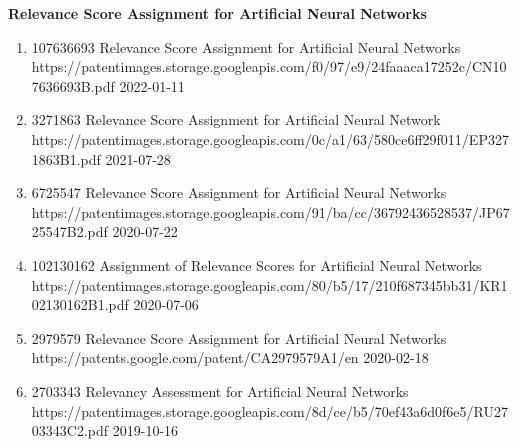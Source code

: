 \documentclass[10pt,a4paper]{article} %
\begin{document}
\headedsection %
{\bf Relevance Score Assignment for Artificial Neural Networks}
{
    \begin{enumerate}
        \item[] 
                          {107636693}
                          {Relevance Score Assignment for Artificial Neural Networks}
                          {https://patentimages.storage.googleapis.com/f0/97/e9/24faaaca17252c/CN107636693B.pdf}
                          {2022-01-11}

        \item [] 
                           {3271863}
                           {Relevance Score Assignment for Artificial Neural Network}
                           {https://patentimages.storage.googleapis.com/0c/a1/63/580ce6ff29f011/EP3271863B1.pdf}
                           {2021-07-28}

        \item [] 
                           {6725547}
                           {Relevance Score Assignment for Artificial Neural Networks}
                           {https://patentimages.storage.googleapis.com/91/ba/cc/36792436528537/JP6725547B2.pdf}
                           {2020-07-22}

        \item [] 
                           {102130162}
                           {Assignment of Relevance Scores for Artificial Neural Networks}
                           {https://patentimages.storage.googleapis.com/80/b5/17/210f687345bb31/KR102130162B1.pdf}
                           {2020-07-06}

        \item [] 
                           {2979579}
                           {Relevance Score Assignment for Artificial Neural Networks}
                           {https://patents.google.com/patent/CA2979579A1/en}
                           {2020-02-18}

        \item [] 
                           {2703343}
                           {Relevancy Assessment for Artificial Neural Networks}
                           {https://patentimages.storage.googleapis.com/8d/ce/b5/70ef43a6d0f6e5/RU2703343C2.pdf}
                           {2019-10-16}
    \end{enumerate}
}

\end{document}
